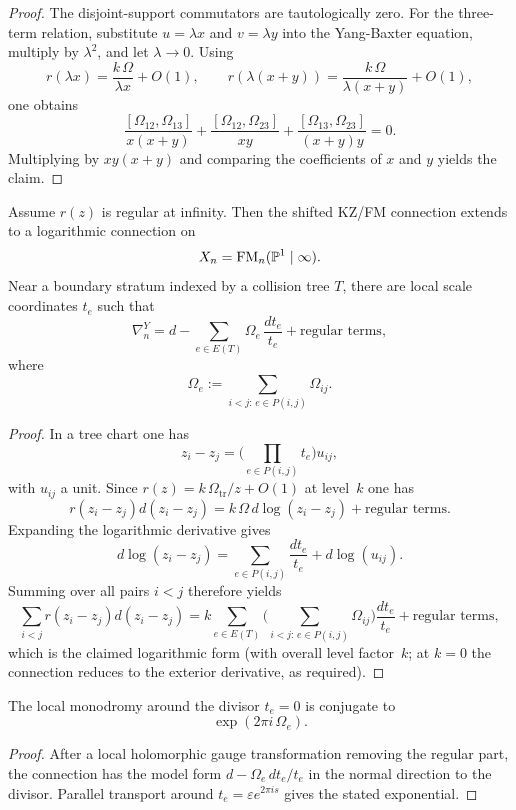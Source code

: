 \begin{proof}
The disjoint-support commutators are tautologically zero. For the three-term relation, substitute $u=\lambda x$ and $v=\lambda y$ into the Yang-Baxter equation, multiply by $\lambda^2$, and let $\lambda\to 0$. Using
\[
 r(\lambda x)=\frac{k\,\Omega}{\lambda x}+O(1),
 \qquad
 r(\lambda(x+y))=\frac{k\,\Omega}{\lambda(x+y)}+O(1),
\]
one obtains
\[
 \frac{[\Omega_{12},\Omega_{13}]}{x(x+y)}+
 \frac{[\Omega_{12},\Omega_{23}]}{xy}+
 \frac{[\Omega_{13},\Omega_{23}]}{(x+y)y}=0.
\]
Multiplying by $xy(x+y)$ and comparing the coefficients of $x$ and $y$ yields the claim.
\end{proof}

\begin{proposition}\label{prop:strict-log-ext}
Assume $r(z)$ is regular at infinity. Then the shifted KZ/FM connection extends to a logarithmic connection on
\[
 X_n=\mathrm{FM}_n(\mathbb P^1\mid\infty).
\]
Near a boundary stratum indexed by a collision tree $T$, there are local scale coordinates $t_e$ such that
\[
 \nabla_n^Y = d-\sum_{e\in E(T)} \Omega_e\,\frac{dt_e}{t_e}+\text{regular terms},
\]
where
\[
 \Omega_e:=\sum_{i<j:\,e\in P(i,j)}\Omega_{ij}.
\]
\end{proposition}

\begin{proof}
In a tree chart one has
\[
 z_i-z_j = \Big(\prod_{e\in P(i,j)}t_e\Big)u_{ij},
\]
with $u_{ij}$ a unit. Since $r(z)=k\,\Omega_{\mathrm{tr}}/z+O(1)$ at level~$k$ one has
\[
 r(z_i-z_j)d(z_i-z_j)=k\,\Omega\,d\log(z_i-z_j)+\text{regular terms}.
\]
Expanding the logarithmic derivative gives
\[
 d\log(z_i-z_j)=\sum_{e\in P(i,j)}\frac{dt_e}{t_e}+d\log(u_{ij}).
\]
Summing over all pairs $i<j$ therefore yields
\[
 \sum_{i<j}r(z_i-z_j)d(z_i-z_j)=k\sum_{e\in E(T)}\Big(\sum_{i<j:\,e\in P(i,j)}\Omega_{ij}\Big)\frac{dt_e}{t_e}+\text{regular terms},
\]
which is the claimed logarithmic form \textup{(}with overall level factor~$k$; at $k=0$ the connection reduces to the exterior derivative, as required\textup{)}.
\end{proof}

\begin{corollary}\label{cor:strict-monodromy}
The local monodromy around the divisor $t_e=0$ is conjugate to
\[
 \exp(2\pi i\,\Omega_e).
\]
\end{corollary}

\begin{proof}
After a local holomorphic gauge transformation removing the regular part, the connection has the model form $d-\Omega_e\,dt_e/t_e$ in the normal direction to the divisor. Parallel transport around $t_e=\varepsilon e^{2\pi i s}$ gives the stated exponential.
\end{proof}

